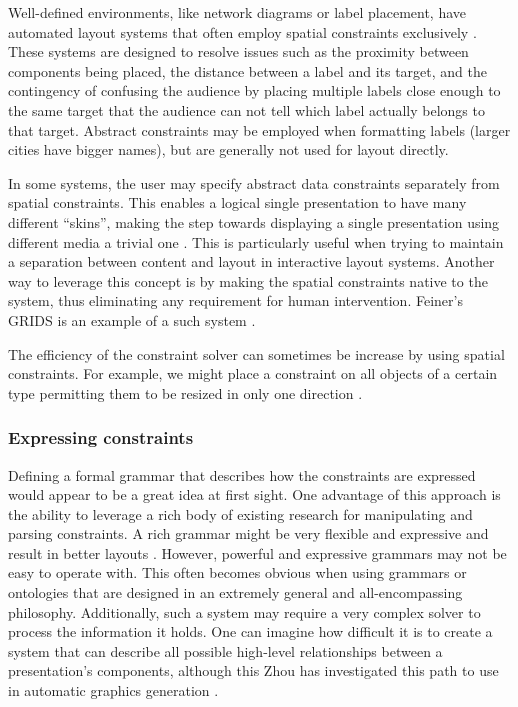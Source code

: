       Well-defined environments, like network diagrams or label placement, have
      automated layout systems that often employ spatial constraints
      exclusively \citep{kosak-1,christensen-1}. These systems are designed to
      resolve issues such as the proximity between components being placed, the
      distance between a label and its target, and the contingency of confusing
      the audience by placing multiple labels close enough to the same target
      that the audience can not tell which label actually belongs to that target.
      Abstract constraints may be employed when formatting labels (larger
      cities have bigger names), but are generally not used for layout
      directly.

      In some systems, the user may specify abstract data constraints
      separately from spatial constraints. This enables a logical single
      presentation to have many different ``skins'', making the step towards
      displaying a single presentation using different media a trivial one
      \citep{weitzman-2}. This is particularly useful when trying to maintain a
      separation between content and layout in interactive layout systems.
      Another way to leverage this concept is by making the spatial constraints
      native to the system, thus eliminating any requirement for human
      intervention. Feiner’s GRIDS is an example of a such system
      \citep{feiner-1}.

      The efficiency of the constraint solver can sometimes be increase by
      using spatial constraints. For example, we might place a constraint on
      all objects of a certain type permitting them to be resized in only one
      direction \citep{linton-1}.
     
    \subsubsection{Expressing constraints}

     Defining a formal grammar that describes how the constraints are expressed
     would appear to be a great idea at first sight. One advantage of this
     approach is the ability to leverage a rich body of existing research for
     manipulating and parsing constraints. A rich grammar might be very
     flexible and expressive and result in better layouts \citep{weitzman-1}.
     However, powerful and expressive grammars may not be easy to operate with.
     This often becomes obvious when using grammars or ontologies that are
     designed in an extremely general and all-encompassing philosophy.
     Additionally, such a system may require a very complex solver to process
     the information it holds. One can imagine how difficult it is to create a
     system that can describe all possible high-level relationships between a
     presentation's components, although this Zhou has investigated this path
     to use in automatic graphics generation \citep{zhou-1}.

